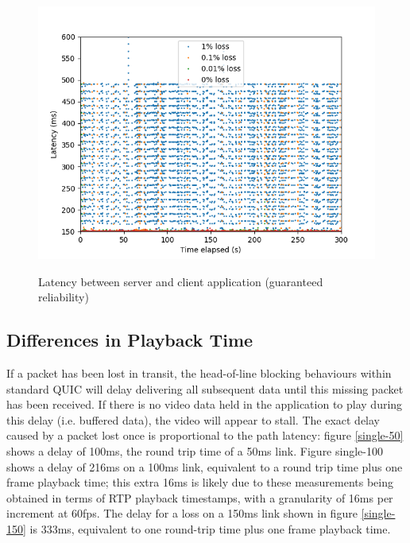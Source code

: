 \documentclass{mpaper}
\begin{document}
\begin{figure}
{   \includegraphics[scale=0.5]{images/graphics-reliable/150ms-app-latencies-combined-reliable.png}
   \label{app-rel-150}
 }
 \caption{Latency between server and client application (guaranteed reliability)}
 \label{app-rel}
\end{figure}







\clearpage
\subsection{Differences in Playback Time}

If a packet has been lost in transit, the head-of-line blocking behaviours within standard QUIC will delay delivering all subsequent data until this missing packet has been received. If there is no video data held in the application to play during this delay (i.e. buffered data), the video will appear to stall. The exact delay caused by a packet lost once is proportional to the path latency: figure \ref{single-50} shows a delay of 100ms, the round trip time of a 50ms link. Figure {single-100} shows a delay of 216ms on a 100ms link, equivalent to a round trip time plus one frame playback time; this extra 16ms is likely due to these measurements being obtained in terms of RTP playback timestamps, with a granularity of 16ms per increment at 60fps. The delay for a loss on a 150ms link shown in figure \ref{single-150} is 333ms, equivalent to one round-trip time plus one frame playback time.
\end{document}
